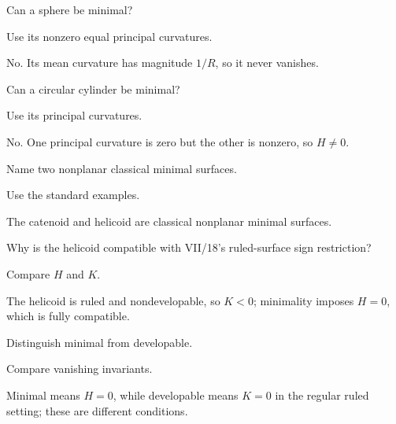 \begin{exercise}\label{exr:vii19-17}
Can a sphere be minimal?
\end{exercise}
\begin{hint}
Use its nonzero equal principal curvatures.
\end{hint}
\begin{solution}
No. Its mean curvature has magnitude \(1/R\), so it never vanishes.
\end{solution}

\begin{exercise}\label{exr:vii19-18}
Can a circular cylinder be minimal?
\end{exercise}
\begin{hint}
Use its principal curvatures.
\end{hint}
\begin{solution}
No. One principal curvature is zero but the other is nonzero, so \(H\neq0\).
\end{solution}

\begin{exercise}\label{exr:vii19-19}
Name two nonplanar classical minimal surfaces.
\end{exercise}
\begin{hint}
Use the standard examples.
\end{hint}
\begin{solution}
The catenoid and helicoid are classical nonplanar minimal surfaces.
\end{solution}

\begin{exercise}\label{exr:vii19-20}
Why is the helicoid compatible with VII/18's ruled-surface sign restriction?
\end{exercise}
\begin{hint}
Compare \(H\) and \(K\).
\end{hint}
\begin{solution}
The helicoid is ruled and nondevelopable, so \(K<0\); minimality imposes \(H=0\), which is fully compatible.
\end{solution}

\begin{exercise}\label{exr:vii19-21}
Distinguish minimal from developable.
\end{exercise}
\begin{hint}
Compare vanishing invariants.
\end{hint}
\begin{solution}
Minimal means \(H=0\), while developable means \(K=0\) in the regular ruled setting; these are different conditions.
\end{solution}

